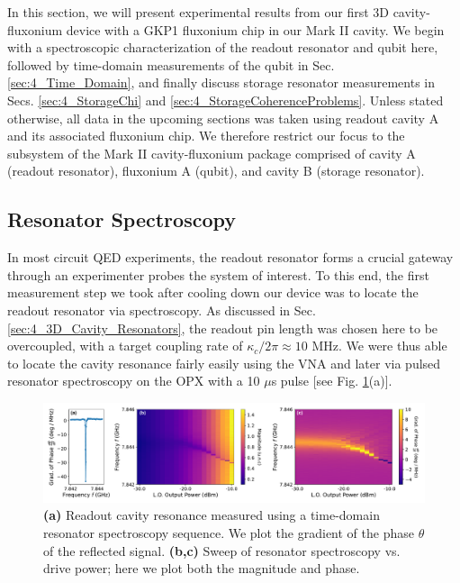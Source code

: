 In this section, we will present experimental results from our first 3D cavity-fluxonium device with a GKP1 fluxonium chip in our Mark II cavity. We begin with a spectroscopic characterization of the readout resonator and qubit here, followed by time-domain measurements of the qubit in Sec. \ref{sec:4_Time_Domain}, and finally discuss storage resonator measurements in Secs. \ref{sec:4_StorageChi} and \ref{sec:4_StorageCoherenceProblems}. Unless stated otherwise, all data in the upcoming sections was taken using readout cavity A and its associated fluxonium chip. We therefore restrict our focus to the subsystem of the Mark II cavity-fluxonium package comprised of cavity A (readout resonator), fluxonium A (qubit), and cavity B (storage resonator).

\subsection{Resonator Spectroscopy}
In most circuit QED experiments, the readout resonator forms a crucial gateway through an experimenter probes the system of interest. To this end, the first measurement step we took after cooling down our device was to locate the readout resonator via spectroscopy. As discussed in Sec. \ref{sec:4_3D_Cavity_Resonators}, the readout pin length was chosen here to be overcoupled, with a target coupling rate of $\kappa_c/2\pi \approx 10$ MHz. We were thus able to locate the cavity resonance fairly easily using the VNA and later via pulsed resonator spectroscopy on the OPX with a 10 $\mu$s pulse [see Fig. \ref{fig:4_resonator_spectroscopy}(a)].
\begin{figure}[h!]
    \centering
    \includegraphics[width=\linewidth]{Figures/4/resonator_spectroscopy.pdf}
    \caption{\textbf{(a)} Readout cavity resonance measured using a time-domain resonator spectroscopy sequence. We plot the gradient of the phase $\theta$ of the reflected signal. \textbf{(b,c)} Sweep of resonator spectroscopy vs. drive power; here we plot both the magnitude and phase.}
    \label{fig:4_resonator_spectroscopy}
\end{figure}

